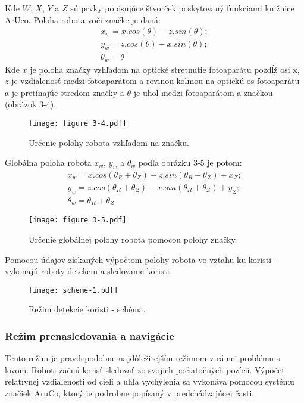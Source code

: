 \justifying
\noindent
Kde $W$, $X$, $Y$ a $Z$ sú prvky popisujúce štvorček poskytovaný funkciami knižnice ArUco. Poloha robota voči značke je
daná:
\begin{gather}\label{r:12}
x_w = x.cos(\theta) - z.sin(\theta); \\
y_w = z.cos(\theta) - x.sin(\theta); \\
\theta_w = \theta
\end{gather}
Kde $x$ je poloha značky vzhľadom na optické stretnutie fotoaparátu pozdĺž osi x, $z$ je vzdialenosť medzi fotoaparátom a rovinou kolmou na optickú os fotoaparátu a je pretínajúc stredom značky a $\theta$ je uhol medzi fotoaparátom a značkou (obrázok 3-4).
\begin{figure}[ht!]
\centering
\texttt{[image: figure 3-4.pdf]}
\caption{Určenie polohy robota vzhľadom na značku.}
\label{o:34}
\end{figure}

\justifying
\noindent
Globálna poloha robota $x_w$, $y_w$ a $\theta_w$ podľa obrázku 3-5 je potom:
\begin{gather}\label{r:2}
x_w = x.cos(\theta_R + \theta_Z) - z.sin(\theta_R+\theta_Z) + x_Z; \\
y_w = z.cos(\theta_R + \theta_Z) - x.sin(\theta_R+\theta_Z) + y_Z; \\
\theta_w = \theta_R + \theta_Z
\end{gather}
\begin{figure}[ht!]
\centering
\texttt{[image: figure 3-5.pdf]}
\caption{Určenie globálnej polohy robota pomocou polohy značky.}
\label{o:35}
\end{figure}
\vspace{3mm}

\justifying
\noindent 
Pomocou údajov získaných výpočtom polohy robota vo vzťahu ku koristi - vykonajú roboty detekciu a sledovanie koristi.
\begin{figure}[ht!]
    \centering
    \texttt{[image: scheme-1.pdf]}
    \caption{Režim detekcie koristi - schéma.}
    \label{o:37}
\end{figure}

\subsubsection{Režim prenasledovania a navigácie}


Tento režim je pravdepodobne najdôležitejším režimom v rámci problému s lovom. Roboti začnú korisť sledovať zo svojich
počiatočných pozícií. Výpočet relatívnej
vzdialenosti od cieli a uhla vychýlenia sa vykonáva pomocou systému značiek AruCo, ktorý je podrobne popísaný v
predchádzajúcej časti.

